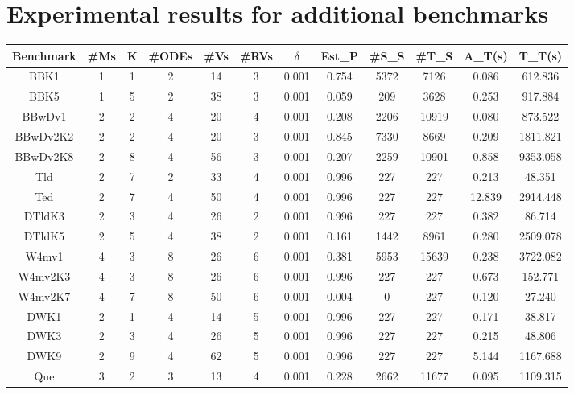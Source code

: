 \section{Experimental results for additional benchmarks}\label{apndx:exp}
\begin{center}
\begin{table*}[ht]
\label{table:exp}
\captionsetup{font=scriptsize}
\centering
\begin{tabular}{c|c|c|c|c|c|c|c|c|c|c|c}
\hline
Benchmark & \#Ms & K & \#ODEs & \#Vs & \#RVs & $\delta$ & Est\_P & \#S\_S & \#T\_S & A\_T(s) & T\_T(s) \\ \hline
BBK1 & 1 & 1 & 2 & 14 & 3 & 0.001 & 0.754 & 5372 & 7126 & 0.086 & 612.836 \\ \hline
BBK5 & 1 & 5 & 2 & 38 & 3 & 0.001 & 0.059 & 209 & 3628 & 0.253 & 917.884 \\ \hline
BBwDv1 & 2 & 2 & 4 & 20 & 4 & 0.001 & 0.208 & 2206 & 10919 & 0.080 & 873.522 \\ \hline
BBwDv2K2 & 2 & 2 & 4 & 20 & 3 & 0.001 & 0.845 & 7330 & 8669 & 0.209 & 1811.821 \\ \hline
BBwDv2K8 & 2 & 8 & 4 & 56 & 3 & 0.001 & 0.207 & 2259 & 10901 & 0.858 & 9353.058 \\ \hline
Tld & 2 & 7 & 2 & 33 & 4 & 0.001 & 0.996 & 227 & 227 & 0.213 & 48.351 \\ \hline
Ted & 2 & 7 & 4 & 50 & 4 & 0.001 & 0.996 & 227 & 227 & 12.839 & 2914.448 \\ \hline
DTldK3 & 2 & 3 & 4 & 26 & 2 & 0.001 & 0.996 & 227 & 227 & 0.382 & 86.714 \\ \hline
DTldK5 & 2 & 5 & 4 & 38 & 2 & 0.001 & 0.161 & 1442 & 8961 & 0.280 & 2509.078 \\ \hline
W4mv1 & 4 & 3 & 8 & 26 & 6 & 0.001 & 0.381 & 5953 & 15639 & 0.238 & 3722.082 \\ \hline
W4mv2K3 & 4 & 3 & 8 & 26 & 6 & 0.001 & 0.996 & 227 & 227 & 0.673 & 152.771 \\ \hline
W4mv2K7 & 4 & 7 & 8 & 50 & 6 & 0.001 & 0.004 & 0 & 227 & 0.120 & 27.240 \\ \hline
DWK1 & 2 & 1 & 4 & 14 & 5 & 0.001 & 0.996 & 227 & 227 & 0.171 & 38.817 \\ \hline
DWK3 & 2 & 3 & 4 & 26 & 5 & 0.001 & 0.996 & 227 & 227 & 0.215 & 48.806 \\ \hline
DWK9 & 2 & 9 & 4 & 62 & 5 & 0.001 & 0.996 & 227 & 227 & 5.144 & 1167.688 \\ \hline
Que & 3 & 2 & 3 & 13 & 4 & 0.001 & 0.228 & 2662 & 11677 & 0.095 & 1109.315 \\ \hline

\end{tabular}
\end{table*}
\end{center}
